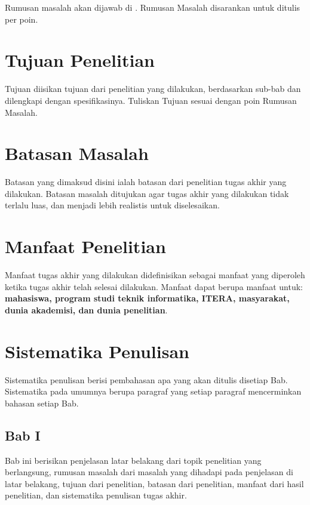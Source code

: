 Rumusan masalah akan dijawab di . Rumusan Masalah disarankan untuk ditulis per poin.

\section{Tujuan Penelitian} \label{I.Tujuan}
Tujuan diisikan tujuan dari penelitian yang dilakukan, berdasarkan sub-bab  dan  dilengkapi dengan spesifikasinya. Tuliskan Tujuan sesuai dengan poin Rumusan Masalah. \par

\section{Batasan Masalah} \label{I.Batasan}
Batasan yang dimaksud disini ialah batasan dari penelitian tugas akhir yang dilakukan. Batasan masalah ditujukan agar tugas akhir yang dilakukan tidak terlalu luas, dan menjadi lebih realistis untuk diselesaikan. \par

\section{Manfaat Penelitian} \label{I.Manfaat}
Manfaat tugas akhir yang dilakukan didefinisikan sebagai manfaat yang diperoleh ketika tugas akhir telah selesai dilakukan. Manfaat dapat berupa manfaat untuk: \textbf{mahasiswa, program studi teknik informatika, ITERA, masyarakat, dunia akademisi, dan dunia penelitian}. \par


\section{Sistematika Penulisan} \label{I.Sistematika}
Sistematika penulisan berisi pembahasan apa yang akan ditulis disetiap Bab. Sistematika pada umumnya berupa paragraf yang setiap paragraf mencerminkan bahasan setiap Bab. \par

\subsection*{Bab I}
Bab ini berisikan penjelasan latar belakang dari topik penelitian yang berlangsung, rumusan masalah dari masalah yang dihadapi pada penjelasan di latar belakang, tujuan dari penelitian, batasan dari penelitian, manfaat dari hasil penelitian, dan sistematika penulisan tugas akhir. \par


